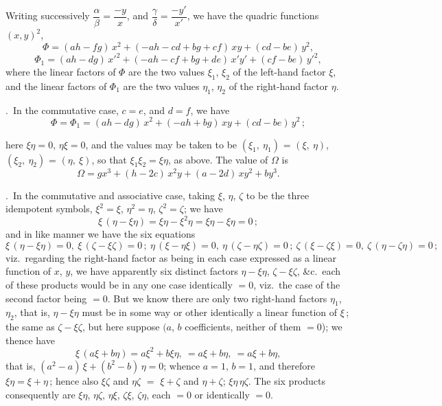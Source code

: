 \documentclass[11pt,a4paper]{article}
\providecommand{\textsc}[1]{{\scshape #1}}
\begin{document}
\medskip
Writing successively $\dfrac{\alpha}{\beta} = \dfrac{-y}{x}$, and $\dfrac{\gamma}{\delta} = \dfrac{-y'}{x'}$, we have the quadric functions $(x, y)^{2}$,
\[
\Phi = (ah - fg)\,x^{2} + (-ah - cd + bg + cf)\,xy + (cd - be)\,y^{2},
\]
\[
\Phi_{1} = (ah - dg)\,x'^{2} + (-ah - cf + bg + de)\,x'y' + (cf - be)\,y'^{2},
\]
where the linear factors of $\Phi$ are the two values $\xi_{1}$, $\xi_{2}$ of the left-hand factor $\xi$, and the linear factors of $\Phi_{1}$ are the two values $\eta_{1}$, $\eta_{2}$ of the right-hand factor $\eta$.

.\ In the commutative case, $c = e$, and $d = f$, we have
\[
\Phi = \Phi_{1} = (ah - dg)\,x^{2} + (-ah + bg)\,xy + (cd - be)\,y^{2}\,;
\]
\clearpage

\fancyhead[C]{\small\textsc{on double algebra.}}
\fancyhead[R]{\small [814}

\thispagestyle{plain}
\noindent here $\xi\eta = 0$, $\eta\xi = 0$, and the values may be taken to be $(\xi_{1},\ \eta_{1})$ = $(\xi,\ \eta)$, $(\xi_{2},\ \eta_{2})$ = $(\eta,\ \xi)$, so that $\xi_{1}\xi_{2} = \xi\eta$, as above.  The value of $\Omega$ is
\[
\Omega = gx^{3} + (h - 2c)\,x^{2}y + (a - 2d)\,xy^{2} + by^{3}.
\]

.\ In the commutative and associative case, taking $\xi$, $\eta$, $\zeta$ to be the three idempotent symbols, $\xi^{2} = \xi$, $\eta^{2} = \eta$, $\zeta^{2} = \zeta$; we have
\[
\xi\,(\eta - \xi\eta) = \xi\eta - \xi^{2}\eta = \xi\eta - \xi\eta = 0\,;
\]
and in like manner we have the six equations
\[
\xi\,(\eta - \xi\eta) = 0,\ \xi\,(\zeta - \xi\zeta) = 0\,;\ \eta\,(\xi - \eta\xi) = 0,\ \eta\,(\zeta - \eta\zeta) = 0\,;\ \zeta\,(\xi - \zeta\xi) = 0,\ \zeta\,(\eta - \zeta\eta) = 0\,;
\]
viz.\ regarding the right-hand factor as being in each case expressed as a linear function of $x$, $y$, we have apparently six distinct factors $\eta - \xi\eta$, $\zeta - \xi\zeta$, \&c.\ each of these products would be in any one case identically $=0$, viz.\ the case of the second factor being $=0$.  But we know there are only two right-hand factors $\eta_{1}$, $\eta_{2}$, that is, $\eta - \xi\eta$ must be in some way or other identically a linear function of $\xi$\,; the same as $\zeta - \xi\zeta$, but here suppose $(a$, $b$ coefficients, neither of them $=0$); we thence have
\[
\xi\,(a\xi + b\eta) = a\xi^{2} + b\xi\eta,\ = a\xi + b\eta,\ = a\xi + b\eta,
\]
that is, $(a^{2} - a)\,\xi + (b^{2} - b)\,\eta = 0$; whence $a = 1$, $b = 1$, and therefore $\xi\eta = \xi + \eta$\,; hence also $\xi\zeta$ and $\eta\zeta$ $=$ $\xi + \zeta$ and $\eta + \zeta$; $\xi\eta$\,$\eta\zeta$. The six products consequently are $\xi\eta$, $\eta\zeta$, $\eta\xi$, $\zeta\xi$, $\zeta\eta$, each $= 0$ or identically $= 0$.
\end{document}
